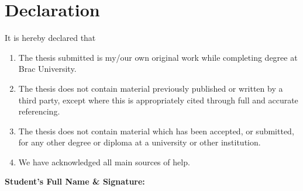\section*{Declaration}

It is hereby declared that
\begin{enumerate}
\item The thesis submitted is my/our own original work while completing degree at Brac University.
\item The thesis does not contain material previously published or written by a third party, except where this is appropriately cited through full and accurate referencing.
\item The thesis does not contain material which has been accepted, or submitted, for any other degree or diploma at a university or other institution.
\item We have acknowledged all main sources of help.
\end{enumerate}

\vspace{0.4cm}
\textbf{Student's Full Name \& Signature:}

\vspace{1.5cm}
\begingroup
    \centering
    
    \hspace{1cm}
    
    \vspace{1.8cm} %
    
    \hspace{1cm}
    
    \vspace{1.8cm} %
    

\endgroup

\clearpage

